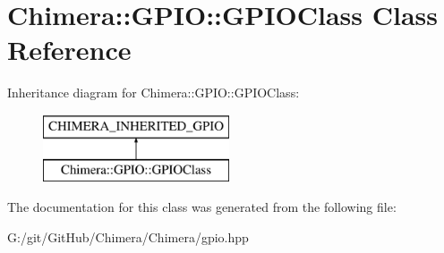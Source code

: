 \hypertarget{class_chimera_1_1_g_p_i_o_1_1_g_p_i_o_class}{}\section{Chimera\+:\+:G\+P\+IO\+:\+:G\+P\+I\+O\+Class Class Reference}
\label{class_chimera_1_1_g_p_i_o_1_1_g_p_i_o_class}
Inheritance diagram for Chimera\+:\+:G\+P\+IO\+:\+:G\+P\+I\+O\+Class\+:\begin{figure}[H]
\begin{center}
\leavevmode
\includegraphics[height=2.000000cm]{class_chimera_1_1_g_p_i_o_1_1_g_p_i_o_class}
\end{center}
\end{figure}


The documentation for this class was generated from the following file\+:\begin{DoxyCompactItemize}
\item 
G\+:/git/\+Git\+Hub/\+Chimera/\+Chimera/gpio.\+hpp\end{DoxyCompactItemize}
